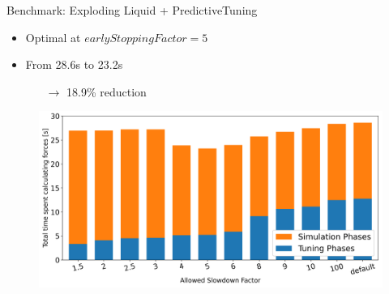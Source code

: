 \documentclass[
	10pt,
	t		%
]{beamer}
\begin{document}
\begin{frame}{Benchmark: Exploding Liquid + PredictiveTuning}

    \begin{itemize}
        \item Optimal at $earlyStoppingFactor = 5$
        \item From 28.6s to 23.2s
              \begin{itemize}
                  \item[$\rightarrow$] 18.9\% reduction
              \end{itemize}
    \end{itemize}


    \begin{figure}[H]
        \centering

        \includegraphics[width=0.92\columnwidth]{../../data/explodingLiquid/cluster/predictiveTuning/analytics/total_time_average_full_scale.png}


    \end{figure}

\end{frame}
\end{document}
